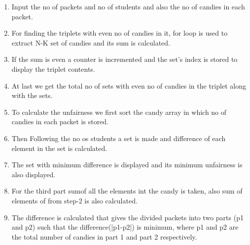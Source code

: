 \documentclass[a4paper,12pt]{report}
\begin{document}
\begin{enumerate}
\item Input the no of packets and no of students and also the no of candies in each packet.
\item For finding the triplets with even no of candies in it, for loop is used to extract N-K set of candies and its sum is calculated.
\item If the sum is even a counter is incremented and the set's index is stored to display the triplet contents.
\item At last we get the total no of sets with even no of candies in the triplet along with the sets.
\item To calculate the unfairness we first sort the candy array in which no of candies in each packet is stored.
\item Then Following the no os students a set is made and difference of each element in the set is calculated.
\item The set with minimum difference is displayed and its minimum unfairness is also displayed.
\item For the third part sumof all the elements int the candy is taken, also sum of elements of from step-2 is also calculated.
\item The difference is calculated that gives the divided packets into two parts (p1 and p2) such that
the difference(|p1-p2|) is minimum, where p1 and p2 are the total number of candies in
part 1 and part 2 respectively.

\end{enumerate}
\end{document}

